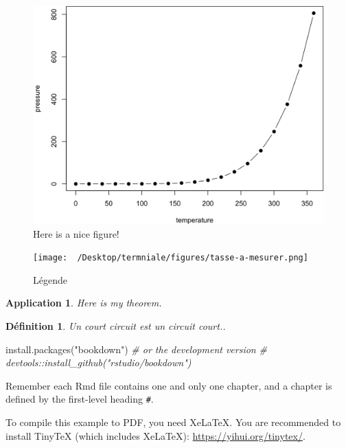 \documentclass[
]{book}
\newenvironment{Shaded}{\begin{snugshade}}{\end{snugshade}}
\newcommand{\CommentTok}[1]{\textcolor[rgb]{0.56,0.35,0.01}{\textit{#1}}}
\newcommand{\FunctionTok}[1]{\textcolor[rgb]{0.00,0.00,0.00}{#1}}
\newcommand{\NormalTok}[1]{#1}
\newcommand{\StringTok}[1]{\textcolor[rgb]{0.31,0.60,0.02}{#1}}
\newtheorem{definition}{Définition}
\newtheorem{theorem}{Application}
\begin{document}
\begin{figure}

{\centering \includegraphics[width=0.8\linewidth]{figures/fig} 

}

\caption{Here is a nice figure!}\label{fig:unnamed-chunk-4}
\end{figure}

\begin{figure}
\centering
\texttt{[image: ~/Desktop/termniale/figures/tasse-a-mesurer.png]}
\caption{Légende}
\end{figure}

\begin{theorem}
\protect\hypertarget{thm:unnamed-chunk-5}{}{\label{thm:unnamed-chunk-5} }Here is my theorem.
\end{theorem}

\begin{definition}
\protect\hypertarget{def:unnamed-chunk-6}{}{\label{def:unnamed-chunk-6} }Un court circuit est un circuit court..
\end{definition}

\begin{Shaded}
\begin{Highlighting}[]
\FunctionTok{install.packages}\NormalTok{(}\StringTok{"bookdown"}\NormalTok{)}
\CommentTok{\# or the development version}
\CommentTok{\# devtools::install\_github("rstudio/bookdown")}
\end{Highlighting}
\end{Shaded}

Remember each Rmd file contains one and only one chapter, and a chapter is defined by the first-level heading \texttt{\#}.

To compile this example to PDF, you need XeLaTeX. You are recommended to install TinyTeX (which includes XeLaTeX): \url{https://yihui.org/tinytex/}.
\end{document}
